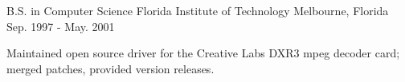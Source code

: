 
\begin{cventries}

  \cventry
    {B.S. in Computer Science} %
    {Florida Institute of Technology} %
    {Melbourne, Florida} %
    {Sep. 1997 - May. 2001} %
    {
      \begin{cvitems} %
        \item {Maintained open source driver for the Creative Labs DXR3 mpeg decoder card; merged patches, provided version releases.}
      \end{cvitems}
    }

\end{cventries}
